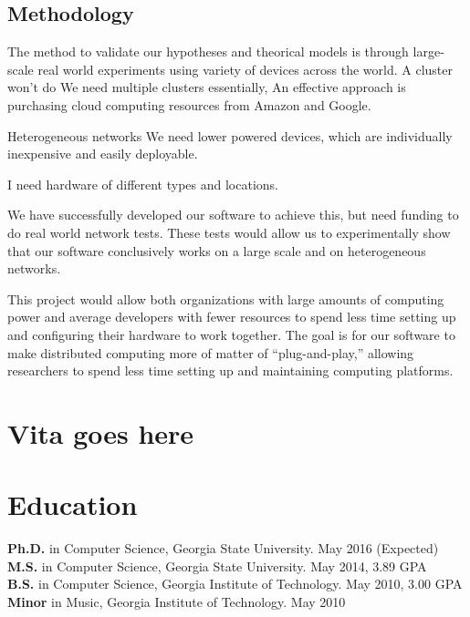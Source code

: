 \documentclass[12pt,a4paper]{article}
\begin{document}
\subsection*{Methodology}

The method to validate our hypotheses and theorical models is through large-scale  real world experiments using variety of devices across the world.
A cluster won't do
We need multiple clusters essentially,
An effective approach is purchasing cloud computing resources from Amazon and Google.



Heterogeneous networks
We need lower powered devices, which are individually inexpensive and easily deployable.

I need hardware of different types and locations.





We have successfully developed our software to achieve this, but need funding to do real world network tests. 
These tests would allow us to experimentally show that our software conclusively works on a large scale and on heterogeneous networks.




This project would allow both organizations with large amounts of computing power and average developers with  fewer resources to spend less time setting up and configuring their hardware to work together.  
The goal is for our software to make distributed computing more of matter of ``plug-and-play,'' allowing researchers to spend less time setting up and maintaining  computing platforms.




\newpage



\section{Vita goes here}

\section*{Education}          
    
{\bf Ph.D.} in Computer Science, Georgia State University. May 2016 (Expected)\\
{\bf M.S.} in Computer Science, Georgia State University. May 2014, 3.89 GPA \\
{\bf B.S.} in Computer Science, Georgia Institute of Technology. May 2010, 3.00 GPA\\
{\bf Minor} in Music, Georgia Institute of Technology. May 2010\\
	
\end{document}
